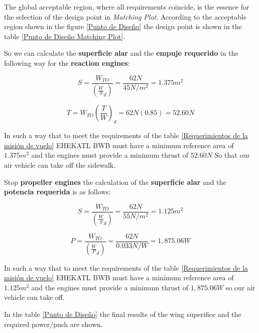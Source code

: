 The global acceptable region, where all requirements coincide, is the essence for the selection of the design point in \textit{Matching Plot}. 
%
According to the acceptable region shown in the figure \ref{Punto de Diseño} the design point is shown in the table \ref{Punto de Diseño Matching Plot}.

\medskip

So we can calculate the \textbf{superficie alar} and the \textbf{empuje requerido} in the following way for the \textbf{reaction engines}:

\begin{equation}
    S = \frac{W_{TO}}{(\frac{W}{S}_d)} = \frac{62 N}{45 N/m^2} = 1.375 m^2
\end{equation}

\begin{equation}
    T = W_{TO} (\frac{T}{W})_d = 62N (0.85) = 52.60N
\end{equation}

In such a way that to meet the requirements of the table \ref{Requerimientos de la misión de vuelo} EHEKATL BWB must have a minimum reference area of $1.375 m^2$ and the engines must provide a minimum thrust of $52.60N$ So that our air vehicle can take off the sidewalk. 

\medskip

Stop \textbf{propeller engines} the calculation of the \textbf{superficie alar} and the \textbf{potencia requerida} is as follows:

\begin{equation}
    S = \frac{W_{TO}}{(\frac{W}{S}_d)} = \frac{62 N}{55 N/m^2} = 1.125 m^2
\end{equation}

\begin{equation}
    P = \frac{W_{TO}}{(\frac{W}{P}_d)} = \frac{62 N}{0.033 N/W} = 1,875.06 W
\end{equation}

In such a way that to meet the requirements of the table \ref{Requerimientos de la misión de vuelo} EHEKATL BWB must have a minimum reference area of $1.125 m^2$ and the engines must provide a minimum thrust of $ 1,875.06 W$ so our air vehicle can take off. 


In the table \ref{Punto de Diseño} the final results of the wing superifice and the required power/push are shown. 


